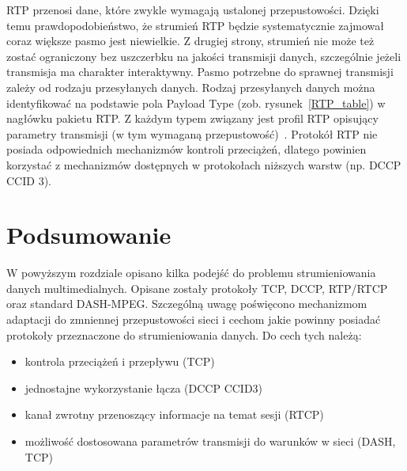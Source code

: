 RTP przenosi dane, które zwykle wymagają ustalonej przepustowości. Dzięki temu prawdopodobieństwo, że strumień RTP będzie systematycznie zajmował coraz większe pasmo jest niewielkie. Z drugiej strony, strumień nie może też zostać ograniczony bez uszczerbku na jakości transmisji danych, szczególnie jeżeli transmisja ma charakter interaktywny. Pasmo potrzebne do sprawnej transmisji zależy od rodzaju przesyłanych danych. Rodzaj przesyłanych danych można identyfikować na podstawie pola Payload Type (zob. rysunek~\ref{RTP_table}) w nagłówku pakietu RTP. Z każdym typem związany jest profil RTP opisujący parametry transmisji (w tym wymaganą przepustowość)~\cite{RFC3551}. Protokół RTP nie posiada odpowiednich mechanizmów kontroli przeciążeń, dlatego powinien korzystać z mechanizmów dostępnych w protokołach niższych warstw (np. DCCP CCID 3).

\section{Podsumowanie}

W powyższym rozdziale opisano kilka podejść do problemu strumieniowania danych multimedialnych. Opisane zostały protokoły TCP, DCCP, RTP/RTCP oraz standard DASH-MPEG. Szczególną uwagę poświęcono mechanizmom adaptacji do zmniennej przepustowości sieci i cechom jakie powinny posiadać protokoły przeznaczone do strumieniowania danych. Do cech tych należą:
\begin{itemize}
\item kontrola przeciążeń i przepływu (TCP)
\item jednostajne wykorzystanie łącza (DCCP CCID3)
\item kanał zwrotny przenoszący informacje na temat sesji (RTCP)
\item możliwość dostosowana parametrów transmisji do warunków w sieci (DASH, TCP)
\end{itemize}

